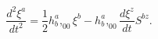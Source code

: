 \begin{equation}
\frac{d^{2}\xi ^{a}}{dt^{2}}=\frac{1}{2}h_{b}^{a},_{00}\xi
^{b}-h_{b}^{a},_{00}\frac{d\xi ^{z}}{dt}S^{bz}.  \label{52}
\end{equation}

